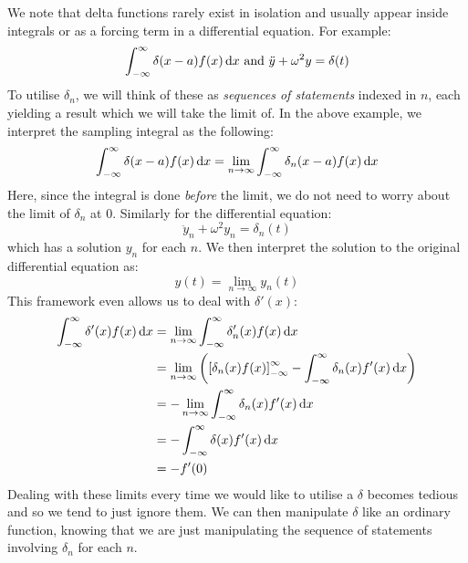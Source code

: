 \documentclass[../main.tex]{subfiles}
\begin{document}
We note that delta functions rarely exist in isolation and usually appear inside integrals or as a forcing term in a differential equation.
For example:
\[
  \int_{-\infty}^{\infty} \delta(x - a)f(x) \d{x} \text{ and } \ddot{y} + \omega^2 y = \delta(t)
\]
To utilise $\delta_n$, we will think of these as \textit{sequences of statements} indexed in $n$, each yielding a result which we will take the limit of.
In the above example, we interpret the sampling integral as the following:
\[
  \int_{-\infty}^{\infty} \delta(x - a) f(x) \d{x} = \lim_{n \to \infty} \int_{-\infty}^{\infty} \delta_n(x - a) f(x) \d{x}
\]
Here, since the integral is done \textit{before} the limit, we do not need to worry about the limit of $\delta_n$ at $0$.
Similarly for the differential equation:
\[
  \ddot{y}_n + \omega^2 y_n = \delta_n(t)
\]
which has a solution $y_n$ for each $n$.
We then interpret the solution to the original differential equation as:
\[
  y(t) = \lim_{n \to \infty} y_n(t)
\]
This framework even allows us to deal with $\delta'(x)$:
\begin{align*}
  \int_{-\infty}^{\infty} \delta'(x)f(x) \d{x} &= \lim_{n \to \infty} \int_{-\infty}^{\infty} \delta'_n(x) f(x) \d{x} \\
                                               &= \lim_{n \to \infty} \left(\eval{\delta_n(x) f(x)}{-\infty}{\infty} - \int_{-\infty}^{\infty} \delta_n(x) f'(x) \d{x}\right) \\
                                               &= - \lim_{n \to \infty} \int_{-\infty}^{\infty} \delta_n(x) f'(x) \d{x} \\
                                               &= - \int_{-\infty}^{\infty} \delta(x)f'(x) \d{x} \\
                                               &= -f'(0)
\end{align*}
Dealing with these limits every time we would like to utilise a $\delta$ becomes tedious and so we tend to just ignore them.
We can then manipulate $\delta$ like an ordinary function, knowing that we are just manipulating the sequence of statements involving $\delta_n$ for each $n$.
\end{document}
